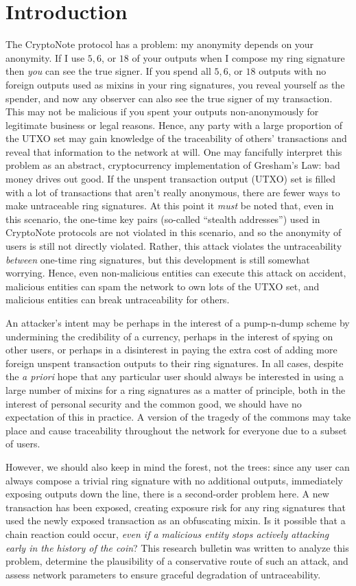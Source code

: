 \documentclass{mrl}
\begin{document}
\section{Introduction}
The CryptoNote protocol has a problem: my anonymity depends on your anonymity. If I use $5, 6$, or $18$ of your outputs when I compose my ring signature then \emph{you} can see the true signer. If you spend all $5, 6$, or $18$ outputs with no foreign outputs used as mixins in your ring signatures, you reveal yourself as the spender, and now any observer can also see the true signer of my transaction.  This may not be malicious if you spent your outputs non-anonymously for legitimate business or legal reasons. Hence, any party with a large proportion of the UTXO set may gain knowledge of the traceability of others' transactions and reveal that information to the network at will.  One may fancifully interpret this problem as an abstract, cryptocurrency implementation of Gresham's Law: bad money drives out good. If the unspent transaction output (UTXO) set is filled with a lot of transactions that aren't really anonymous, there are fewer ways to make untraceable ring signatures. At this point it \emph{must} be noted that, even in this scenario, the one-time key pairs (so-called ``stealth addresses'') used in CryptoNote protocols are not violated in this scenario, and so the anonymity of users is still not directly violated. Rather, this attack violates the untraceability \emph{between} one-time ring signatures, but this development is still somewhat worrying. Hence, even non-malicious entities can execute this attack on accident, malicious entities can spam the network to own lots of the UTXO set, and malicious entities can break untraceability for others.

An attacker's intent may be perhaps in the interest of a pump-n-dump scheme by undermining the credibility of a currency, perhaps in the interest of spying on other users, or perhaps in a disinterest in paying the extra cost of adding more foreign unspent transaction outputs to their ring signatures. In all cases, despite the \emph{a priori} hope that any particular user should always be interested in using a large number of mixins for a ring signatures as a matter of principle, both in the interest of personal security and the common good, we should have no expectation of this in practice. A version of the tragedy of the commons may take place and cause traceability throughout the network for everyone due to a subset of users.

However, we should also keep in mind the forest, not the trees: since any user can always compose a trivial ring signature with no additional outputs, immediately exposing outputs down the line, there is a second-order problem here. A new transaction has been exposed, creating exposure risk for any ring signatures that used the newly exposed transaction as an obfuscating mixin. Is it possible that a chain reaction could occur, \emph{even if a malicious entity stops actively attacking early in the history of the coin}?  This research bulletin was written to analyze this problem, determine the plausibility of a conservative route of such an attack, and assess network parameters to ensure graceful degradation of untraceability.
\end{document}
